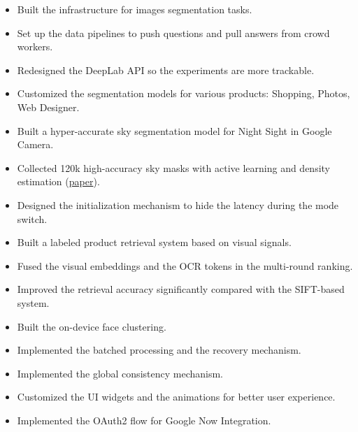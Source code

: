 \documentclass[letterpaper,11pt]{article}
\begin{document}
\begin{itemize}
  \begin{itemize}
  \item Built the infrastructure for images segmentation tasks.
  \item Set up the data pipelines to push questions and pull answers from crowd workers.
  \item Redesigned the DeepLab API so the experiments are more trackable.
  \item Customized the segmentation models for various products: Shopping, Photos, Web Designer.
  \end{itemize}
  \begin{itemize}
  \item Built a hyper-accurate sky segmentation model for Night Sight in Google Camera.
  \item Collected 120k high-accuracy sky masks with active learning and density estimation (\href{https://google.github.io/sky-optimization/}{paper}).
  \item Designed the initialization mechanism to hide the latency during the mode switch.
  \end{itemize}
  \begin{itemize}
  \item Built a labeled product retrieval system based on visual signals.
  \item Fused the visual embeddings and the OCR tokens in the multi-round ranking.
  \item Improved the retrieval accuracy significantly compared with the SIFT-based system.
  \end{itemize}
  \begin{itemize}
  \item Built the on-device face clustering.
  \item Implemented the batched processing and the recovery mechanism.
  \item Implemented the global consistency mechanism.
  \end{itemize}
  \begin{itemize}
  \item Customized the UI widgets and the animations for better user experience.
  \item Implemented the OAuth2 flow for Google Now Integration.
  \end{itemize}
\end{itemize}
\end{document}
